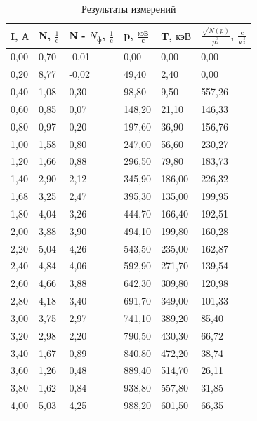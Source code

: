 \documentclass[a4paper, 12pt]{article}
\begin{document}
		\begin{table}[h]
		\centering
		\caption{Результаты измерений}
		\label{table:data}
        \begin{tabular}{|l|l|l|l|l|l|}
    \hline
        I, $\text{А}$ & N, $\frac{1}{\text{c}}$   & N - ${N_\text{ф}}$, $\frac{1}{\text{c}}$ & p, $\frac{\text{кэВ}}{\text{с}}$  & T, $\text{кэВ}$ & $\frac{\sqrt{N(p)}}{p^{\frac{3}{2}}}$, $\frac{\text{c}}{\text{м}^{\frac{3}{2}}}$\\ \hline
        0,00 & 0,70 & -0,01 & 0,00 & 0,00 & 0,00 \\ \hline
        0,20 & 8,77 & -0,02 & 49,40 & 2,40 & 0,00 \\ \hline
        0,40 & 1,08 & 0,30 & 98,80 & 9,50 & 557,26 \\ \hline
        0,60 & 0,85 & 0,07 & 148,20 & 21,10 & 146,33 \\ \hline
        0,80 & 0,97 & 0,20 & 197,60 & 36,90 & 156,76 \\ \hline
        1,00 & 1,58 & 0,80 & 247,00 & 56,60 & 230,27 \\ \hline
        1,20 & 1,66 & 0,88 & 296,50 & 79,80 & 183,73 \\ \hline
        1,40 & 2,90 & 2,12 & 345,90 & 186,00 & 226,32 \\ \hline
        1,68 & 3,25 & 2,47 & 395,30 & 135,00 & 199,95 \\ \hline
        1,80 & 4,04 & 3,26 & 444,70 & 166,40 & 192,51 \\ \hline
        2,00 & 3,88 & 3,90 & 494,10 & 199,80 & 160,28 \\ \hline
        2,20 & 5,04 & 4,26 & 543,50 & 235,00 & 162,87 \\ \hline
        2,40 & 4,84 & 4,06 & 592,90 & 271,70 & 139,54 \\ \hline
        2,60 & 4,66 & 3,88 & 642,30 & 309,80 & 120,98 \\ \hline
        2,80 & 4,18 & 3,40 & 691,70 & 349,00 & 101,33 \\ \hline
        3,00 & 3,75 & 2,97 & 741,10 & 389,20 & 85,40 \\ \hline
        3,20 & 2,98 & 2,20 & 790,50 & 430,30 & 66,72 \\ \hline
        3,40 & 1,67 & 0,89 & 840,80 & 472,20 & 38,74 \\ \hline
        3,60 & 1,26 & 0,48 & 889,40 & 514,70 & 26,11 \\ \hline
        3,80 & 1,62 & 0,84 & 938,80 & 557,80 & 31,85 \\ \hline
        4,00 & 5,03 & 4,25 & 988,20 & 601,50 & 66,35 \\ \hline

\end{tabular}
\end{table}
\end{document}
